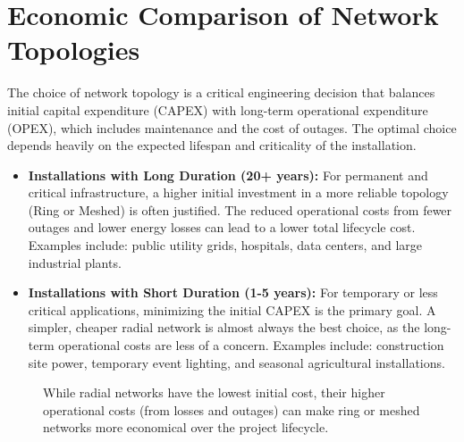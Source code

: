 \documentclass[12pt, a4paper]{article}
\begin{document}
\section{Economic Comparison of Network Topologies}
The choice of network topology is a critical engineering decision that balances initial capital expenditure (CAPEX) with long-term operational expenditure (OPEX), which includes maintenance and the cost of outages. The optimal choice depends heavily on the expected lifespan and criticality of the installation.

\begin{itemize}
    \item \textbf{Installations with Long Duration (20+ years):} For permanent and critical infrastructure, a higher initial investment in a more reliable topology (Ring or Meshed) is often justified. The reduced operational costs from fewer outages and lower energy losses can lead to a lower total lifecycle cost. Examples include: public utility grids, hospitals, data centers, and large industrial plants.
    \item \textbf{Installations with Short Duration (1-5 years):} For temporary or less critical applications, minimizing the initial CAPEX is the primary goal. A simpler, cheaper radial network is almost always the best choice, as the long-term operational costs are less of a concern. Examples include: construction site power, temporary event lighting, and seasonal agricultural installations.
\end{itemize}

\begin{figure}[htbp]
    \centering
    \caption{While radial networks have the lowest initial cost, their higher operational costs (from losses and outages) can make ring or meshed networks more economical over the project lifecycle.}
    \label{fig:cost_comparison}
\end{figure}
\newpage
\appendix
\end{document}
